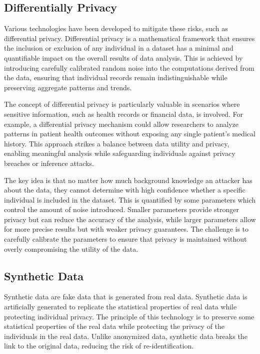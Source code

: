 \documentclass[manuscript,screen,review,anonymous]{acmart}
\begin{document}
\subsection{Differentially Privacy}

Various technologies have been developed to mitigate these risks, such as differential privacy. Differential privacy is a mathematical framework that ensures the inclusion or exclusion of any individual in a dataset has a minimal and quantifiable impact on the overall results of data analysis. This is achieved by introducing carefully calibrated random noise into the computations derived from the data, ensuring that individual records remain indistinguishable while preserving aggregate patterns and trends.

The concept of differential privacy is particularly valuable in scenarios where sensitive information, such as health records or financial data, is involved. For example, a differential privacy mechanism could allow researchers to analyze patterns in patient health outcomes without exposing any single patient's medical history. This approach strikes a balance between data utility and privacy, enabling meaningful analysis while safeguarding individuals against privacy breaches or inference attacks.

The key idea is that no matter how much background knowledge an attacker has about the data, they cannot determine with high confidence whether a specific individual is included in the dataset. This is quantified by some parameters which control the amount of noise introduced. Smaller parameters provide stronger privacy but can reduce the accuracy of the analysis, while larger parameters allow for more precise results but with weaker privacy guarantees. The challenge is to carefully calibrate the parameters to ensure that privacy is maintained without overly compromising the utility of the data.

\subsection{Synthetic Data}

Synthetic data are fake data that is generated from real data. Synthetic data is artificially generated to replicate the statistical properties of real data while protecting individual privacy. The principle of this technology is to preserve some statistical properties of the real data while protecting the privacy of the individuals in the real data. Unlike anonymized data, synthetic data breaks the link to the original data, reducing the risk of re-identification.
\end{document}
